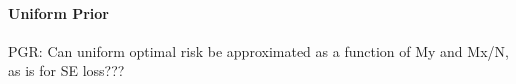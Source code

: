 \documentclass[12pt]{report}
\DeclareMathOperator{\Prm}{\mathrm{P}}
\begin{document}
%
%
%
%
%
%
%
%



\paragraph{Uniform Prior}

PGR: Can uniform optimal risk be approximated as a function of My and Mx/N, as is for SE loss???
\end{document}
